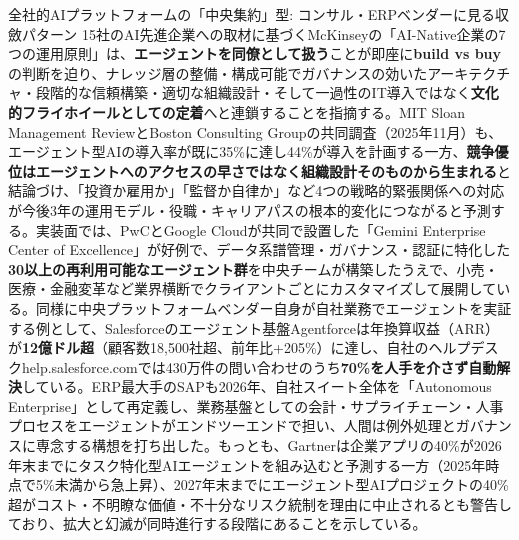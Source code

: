 \begin{casestudy}{全社的AIプラットフォームの「中央集約」型: コンサル・ERPベンダーに見る収斂パターン}
15社のAI先進企業への取材に基づくMcKinseyの「AI-Native企業の7つの運用原則」は、\textbf{エージェントを同僚として扱う}ことが即座に\textbf{build vs buy}の判断を迫り、ナレッジ層の整備・構成可能でガバナンスの効いたアーキテクチャ・段階的な信頼構築・適切な組織設計・そして一過性のIT導入ではなく\textbf{文化的フライホイールとしての定着}へと連鎖することを指摘する\cite{y03mckinsey2026sevenoperatingtruths}。MIT Sloan Management ReviewとBoston Consulting Groupの共同調査（2025年11月）も、エージェント型AIの導入率が既に35\%に達し44\%が導入を計画する一方、\textbf{競争優位はエージェントへのアクセスの早さではなく組織設計そのものから生まれる}と結論づけ、「投資か雇用か」「監督か自律か」など4つの戦略的緊張関係への対応が今後3年の運用モデル・役職・キャリアパスの根本的変化につながると予測する\cite{y03mitsloanbcg2025agenticenterprise}。実装面では、PwCとGoogle Cloudが共同で設置した「Gemini Enterprise Center of Excellence」が好例で、データ系譜管理・ガバナンス・認証に特化した\textbf{30以上の再利用可能なエージェント群}を中央チームが構築したうえで、小売・医療・金融変革など業界横断でクライアントごとにカスタマイズして展開している\cite{y03pwc2026googlecoe}。同様に中央プラットフォームベンダー自身が自社業務でエージェントを実証する例として、Salesforceのエージェント基盤Agentforceは年換算収益（ARR）が\textbf{12億ドル超}（顧客数18,500社超、前年比+205\%）に達し、自社のヘルプデスクhelp.salesforce.comでは430万件の問い合わせのうち\textbf{70\%を人手を介さず自動解決}している\cite{y03salesforce2026agentforcesuccess}。ERP最大手のSAPも2026年、自社スイート全体を「Autonomous Enterprise」として再定義し、業務基盤としての会計・サプライチェーン・人事プロセスをエージェントがエンドツーエンドで担い、人間は例外処理とガバナンスに専念する構想を打ち出した\cite{y03forbes2026sapautonomous}。もっとも、Gartnerは企業アプリの40\%が2026年末までにタスク特化型AIエージェントを組み込むと予測する一方（2025年時点で5\%未満から急上昇）、2027年末までにエージェント型AIプロジェクトの40\%超がコスト・不明瞭な価値・不十分なリスク統制を理由に中止されるとも警告しており、拡大と幻滅が同時進行する段階にあることを示している\cite{y03gartner2025agentapps40pct}。
\end{casestudy}

